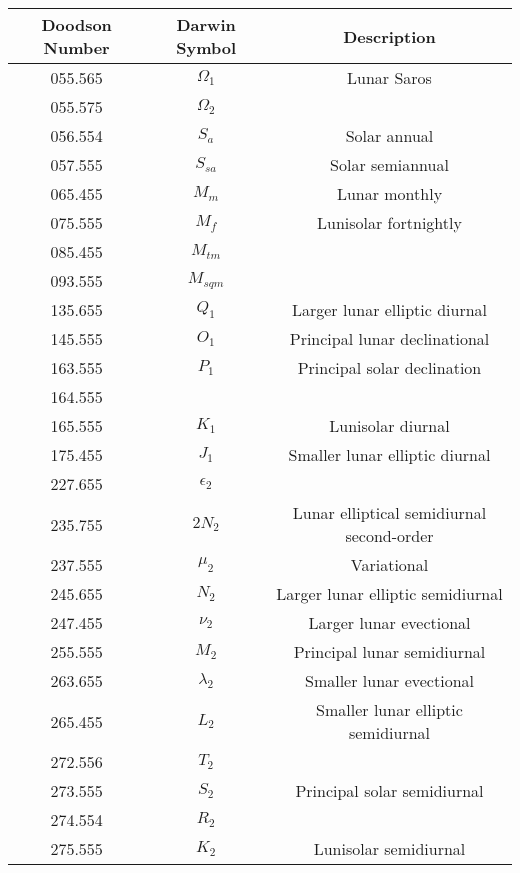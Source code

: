 \begin{table}[h!]
  \centering
  \begin{tabular}{ccc}
      \hline
      \textbf{Doodson Number} & \textbf{Darwin Symbol} & \textbf{Description} \\
      \hline
      055.565 & $\Omega _1$ & Lunar Saros \\
      055.575 & $\Omega _2$ & \\
      056.554 & $S_a$ & Solar annual \\
      057.555 & $S_{sa}$ & Solar semiannual \\
      065.455 & $M_m$ & Lunar monthly \\
      075.555 & $M_f$ & Lunisolar fortnightly \\
      085.455 & $M_{tm}$ & \\
      093.555 & $M_{sqm}$ & \\
      135.655 & $Q_1$ & Larger lunar elliptic diurnal \\
      145.555 & $O_1$ & Principal lunar declinational \\
      163.555 & $P_1$ & Principal solar declination \\
      164.555 & & \\
      165.555 & $K_1$ & Lunisolar diurnal \\
      175.455 & $J_1$ & Smaller lunar elliptic diurnal \\
      227.655 & $\epsilon _2$ & \\
      235.755 & $2N_2$ & Lunar elliptical semidiurnal second-order \\
      237.555 & $\mu _2$ & Variational \\
      245.655 & $N_2$ & Larger lunar elliptic semidiurnal \\
      247.455 & $\nu _2$ & Larger lunar evectional \\
      255.555 & $M_2$ & Principal lunar semidiurnal \\
      263.655 & $\lambda _2$ & Smaller lunar evectional \\
      265.455 & $L_2$ & Smaller lunar elliptic semidiurnal \\
      272.556 & $T_2$ & \\
      273.555 & $S_2$ & Principal solar semidiurnal \\
      274.554 & $R_2$ & \\
      275.555 & $K_2$ & Lunisolar semidiurnal \\

\end{tabular}
\end{table}
